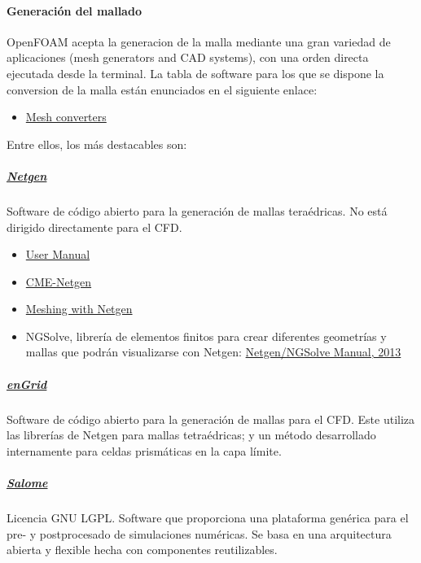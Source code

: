 \paragraph{Generación del mallado}\label{header-n181}

OpenFOAM acepta la generacion de la malla mediante una gran variedad de
aplicaciones (mesh generators and CAD systems), con una orden directa
ejecutada desde la terminal. La tabla de software para los que se
dispone la conversion de la malla están enunciados en el siguiente
enlace:

\begin{itemize}
\item
  \href{http://www.openfoam.org/features/mesh-conversion.php}{Mesh
  converters}
\end{itemize}

Entre ellos, los más destacables son:

\subparagraph{\texorpdfstring{
\href{https://ngsolve.org/}{Netgen}}{Netgen}}\label{header-n190}

Software de código abierto para la generación de mallas teraédricas. No
está dirigido directamente para el CFD.

\begin{itemize}
\item
  \href{http://www.netgen-toolbox.org/netgen_usermanual.pdf}{User
  Manual}
\item
  \href{http://www.asc.tuwien.ac.at/~schoeberl/wiki/index.php/Netgen}{CME-Netgen}
\item
  \href{http://www.vmtk.org/tutorials/NetgenWay.html}{Meshing with
  Netgen}
\item
  NGSolve, librería de elementos finitos para crear diferentes
  geometrías y mallas que podrán visualizarse con Netgen:
  \href{https://www.math.uzh.ch/compmath/fileadmin/user/stas/compmath/Abschlussarbeiten/Arnold_Noam/myManual.pdf}{Netgen/NGSolve
  Manual, 2013}
\end{itemize}

\subparagraph{\texorpdfstring{
\href{http://engits.eu/en/engrid}{enGrid}}{enGrid}}\label{header-n206}

Software de código abierto para la generación de mallas para el CFD.
Este utiliza las librerías de Netgen para mallas tetraédricas; y un
método desarrollado internamente para celdas prismáticas en la capa
límite.

\subparagraph{\texorpdfstring{
\href{www.salome-platform.org}{Salome}}{Salome}}\label{header-n209}

Licencia GNU LGPL. Software que proporciona una plataforma genérica para
el pre- y postprocesado de simulaciones numéricas. Se basa en una
arquitectura abierta y flexible hecha con componentes reutilizables.

